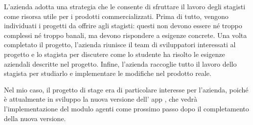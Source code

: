L'azienda adotta una strategia che le consente di sfruttare il lavoro degli stagisti come risorsa utile per i prodotti commercializzati. 
Prima di tutto, vengono individuati i progetti da offrire agli stagisti: questi non devono essere né troppo complessi né troppo banali, 
ma devono rispondere a esigenze concrete. Una volta completato il progetto, l'azienda riunisce il team di sviluppatori interessati 
al progetto e lo stagista per discutere come lo studente ha risolto le esigenze aziendali descritte nel progetto. 
Infine, l'azienda raccoglie tutto il lavoro dello stagista per studiarlo e implementare le modifiche nel prodotto reale.

Nel mio caso, il progetto di stage era di particolare interesse per l'azienda, poiché è attualmente in sviluppo la nuova versione dell'
app {\movi}, che vedrà l'implementazione del modulo agenti come prossimo passo dopo il completamento della nuova versione.

